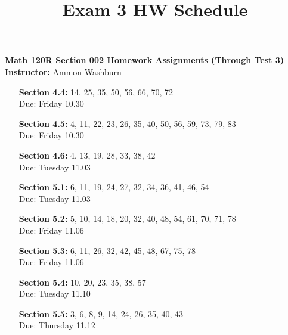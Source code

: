 \documentclass[fleqn]{article}
\title{Exam 3 HW Schedule}
\begin{document}
{\centering
{\bf Math 120R Section 002 Homework Assignments (Through Test 3)} \\[10px]
{\bf Instructor: } Ammon Washburn \\[20px]
}

\begin{enumerate}
\item[\bf Section 4.4:] 14, 25, 35, 50, 56, 66, 70, 72 \\
{\color{blue} Due: Friday 10.30}

\item[\bf Section 4.5:] 4, 11, 22, 23, 26, 35, 40, 50, 56, 59, 73, 79, 83 \\
{\color{blue} Due: Friday 10.30}

\item[\bf Section 4.6:] 4, 13, 19, 28, 33, 38, 42 \\
{\color{blue} Due: Tuesday 11.03}

\item[\bf Section 5.1:] 6, 11, 19, 24, 27, 32, 34, 36, 41, 46, 54 \\
{\color{blue} Due: Tuesday 11.03}

\item[\bf Section 5.2:] 5, 10, 14, 18, 20, 32, 40, 48, 54, 61, 70, 71, 78 \\
{\color{blue} Due: Friday 11.06}

\item[\bf Section 5.3:] 6, 11, 26, 32, 42, 45, 48, 67, 75, 78 \\
{\color{blue} Due: Friday 11.06}

\item[\bf Section 5.4:] 10, 20, 23, 35, 38, 57 \\
{\color{blue} Due: Tuesday 11.10}

\item[\bf Section 5.5:] 3, 6, 8, 9, 14, 24, 26, 35, 40, 43 \\
{\color{blue} Due: Thursday 11.12}

\end{enumerate}
\end{document}

